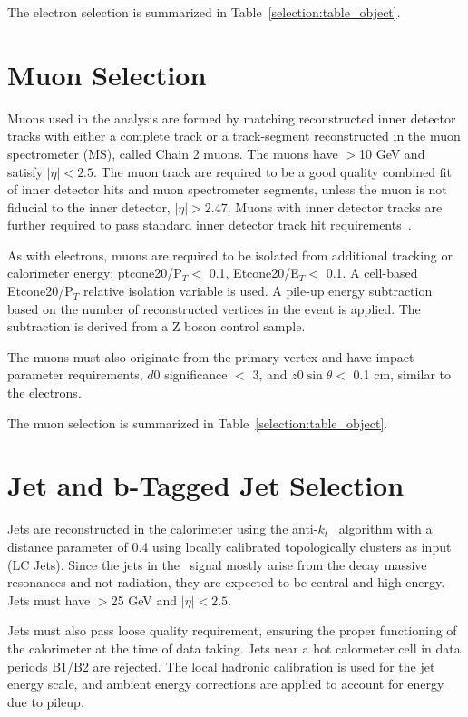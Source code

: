 The electron selection is summarized in Table~\ref{selection:table_object}. 


\section{Muon Selection}

Muons used in the analysis are formed by matching reconstructed inner detector
tracks with either a complete track or a track-segment reconstructed in the muon spectrometer (MS),
called Chain 2 muons. The muons have \pt$>$10 GeV and satisfy $|\eta| < 2.5$.
The muon track are required to be a good quality combined fit of inner detector hits and muon
spectrometer segments, unless the muon is not fiducial to the
inner detector, $|\eta| > 2.47$.  Muons with inner detector tracks are further required
to pass standard inner detector track hit requirements~\cite{MCP2012}.  

As with electrons, muons are required to be isolated from 
additional tracking or calorimeter energy: ptcone20/P$_T <$ 0.1, Etcone20/E$_T <$ 0.1. A cell-based Etcone20/P$_T$ relative
isolation variable is used. A pile-up energy subtraction based 
on the number of reconstructed vertices in the event is applied. The
subtraction is derived from a Z boson control sample.


The muons must also originate from the primary vertex and have impact parameter requirements, $d0$ significance $<$ 3, and $z0\sin{\theta} <$ 0.1 cm, similar to the electrons. 


The muon selection is summarized in Table~\ref{selection:table_object}. 

\section{Jet and b-Tagged Jet Selection}

Jets are reconstructed in the calorimeter using the anti-$k_t$~\cite{Cacciari:2008gp} algorithm
with a distance parameter of 0.4 using locally calibrated
topologically clusters as input (LC Jets). Since the jets in the \tth\
signal mostly arise from the decay massive resonances and not radiation,
they are expected to be central and high energy. Jets must have \pt$>$25 GeV and 
$|\eta|<2.5$. 

Jets must also pass loose quality requirement, ensuring the proper
functioning of the calorimeter at the time of data taking. Jets near a hot calormeter cell in data periods
B1/B2 are rejected. The local hadronic calibration is used for
the jet energy scale, and ambient energy corrections are applied to account
for energy due to pileup.

